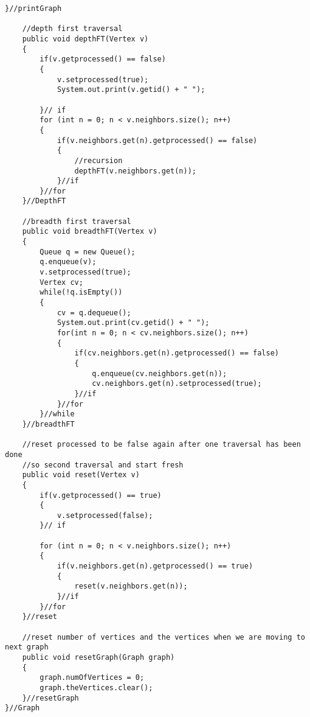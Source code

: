 \documentclass{article}
\begin{document}
\begin{lstlisting}[frame =single,
backgroundcolor = \color{grey!12}]
	 }//printGraph
	  
	//depth first traversal
	public void depthFT(Vertex v)
	{
		if(v.getprocessed() == false)
		{
			v.setprocessed(true);
			System.out.print(v.getid() + " ");
			
		}// if
		for (int n = 0; n < v.neighbors.size(); n++)
		{
			if(v.neighbors.get(n).getprocessed() == false)
			{
				//recursion
				depthFT(v.neighbors.get(n));
			}//if
		}//for
	}//DepthFT
	
	//breadth first traversal
	public void breadthFT(Vertex v)
	{
		Queue q = new Queue();
		q.enqueue(v);
		v.setprocessed(true);
		Vertex cv;
		while(!q.isEmpty())
		{
			cv = q.dequeue();
			System.out.print(cv.getid() + " ");
			for(int n = 0; n < cv.neighbors.size(); n++)
			{
				if(cv.neighbors.get(n).getprocessed() == false)
				{
					q.enqueue(cv.neighbors.get(n));
					cv.neighbors.get(n).setprocessed(true);
				}//if
			}//for
		}//while
	}//breadthFT
	
	//reset processed to be false again after one traversal has been done
	//so second traversal and start fresh
	public void reset(Vertex v)
	{
		if(v.getprocessed() == true)
		{
			v.setprocessed(false);
		}// if
		
		for (int n = 0; n < v.neighbors.size(); n++)
		{
			if(v.neighbors.get(n).getprocessed() == true)
			{
				reset(v.neighbors.get(n));
			}//if
		}//for
	}//reset
	
	//reset number of vertices and the vertices when we are moving to next graph
	public void resetGraph(Graph graph)
	{
		graph.numOfVertices = 0;
		graph.theVertices.clear();
	}//resetGraph
}//Graph

\end{lstlisting}
\large
\end{document}
